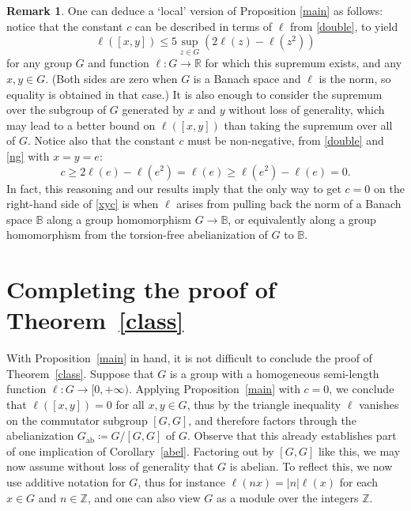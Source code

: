 \documentclass[11pt,a4paper,reqno]{amsart}
\numberwithin{equation}{section}
\theoremstyle{plain}
\theoremstyle{definition}
\newtheorem{remark}[equation]{Remark}
\newcommand\R{\mathbb{R}}
\newcommand\Z{\mathbb{Z}}
\newcommand\normsymb{\ell}  %
\newcommand\norm[1]{\ell({#1})}   %
\begin{document}

\begin{remark}
{
One can deduce a `local' version of Proposition \ref{main} as follows:
notice that the constant $c$ can be described in terms of $\normsymb$
from \eqref{double}, to yield
\begin{equation}\label{9bound}
\norm{ [x,y] } \leq 5 \sup_{z \in G} \left( 2 \norm{z} - \norm{z^2} \right)
\end{equation}
for any group $G$ and function $\normsymb : G \to \R$ for which this supremum exists, and any $x,y \in G$.
(Both sides are zero when $G$ is a Banach space and $\normsymb$ is the
norm, so equality is obtained in that case.)
It is also enough to consider the supremum over the subgroup of $G$
generated by $x$ and $y$ without loss of generality, which may lead to a
better bound on $\norm{ [x,y] }$ than taking the supremum over all of $G$.
Notice also that the constant $c$ must be non-negative, from \eqref{double} and \eqref{ng} with $x=y=e$:
\begin{equation}\label{Enonneg2}
c \geq 2 \norm{e} - \norm{e^2} = \norm{e} \geq \norm{e^2} - \norm{e} = 0.
\end{equation}
In fact, this reasoning and our results imply that the only way to get
$c=0$ on the right-hand side of \eqref{xyc} is when $\normsymb$
arises from pulling back the norm of a Banach space $\mathbb{B}$ along a
group homomorphism $G\to\mathbb{B}$, or equivalently along a group
homomorphism from the torsion-free abelianization of $G$ to $\mathbb{B}$.
}
\end{remark}


\section{Completing the proof of Theorem~\ref{class}}

With Proposition~\ref{main} in hand, it is not difficult to conclude the
proof of Theorem~\ref{class}.  Suppose that $G$ is a group with a
homogeneous { semi-}length function $\normsymb: G \to [0,+\infty)$.
Applying Proposition~\ref{main} with { $c=0$}, we conclude that
$\norm{[x,y]}=0$ for all $x,y \in G$, thus by the triangle inequality
$\normsymb$ vanishes on the commutator subgroup $[G,G]$, and therefore
factors through the abelianization $G_{\mathrm{ab}} \coloneqq G/[G,G]$ of
$G$.  Observe that this already establishes part of one implication of
Corollary~\ref{abel}.  Factoring out by $[G,G]$ like this, we may now
assume without loss of generality that $G$ is abelian.  To
reflect this, we now use additive notation for $G$, thus for instance
$\norm{nx} = |n| \norm{x}$ for each $x \in G$ and $n \in \Z$, and one can
also view $G$ as a module over the integers $\Z$.
\end{document}

